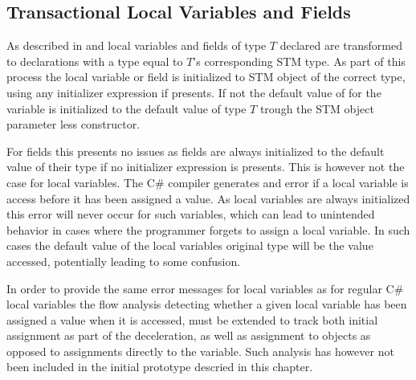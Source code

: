 \subsection{Transactional Local Variables and Fields}
As described in  and  local variables and fields of type $T$ declared  are transformed to declarations with a type equal to $T$'s corresponding \ac{STM} type. As part of this process the local variable or field is initialized to \ac{STM} object of the correct type, using any initializer expression if presents. If not the default value of for the variable is initialized to the default value of type $T$ trough the \ac{STM} object parameter less constructor. 

For fields this presents no issues as fields are always initialized to the default value of their type if no initializer expression is presents\cite[p. 93]{csharp2013specificaiton}. This is however not the case for local variables. The C\# compiler generates and error if a local variable is access before it has been assigned a value\cite[p. 96]{csharp2013specificaiton}. As  local variables are always initialized this error will never occur for such variables, which can lead to unintended behavior in cases where the programmer forgets to assign a  local variable. In such cases the default value of the  local variables original type will be the value accessed, potentially leading to some confusion.

In order to provide the same error messages for  local variables as for regular C\# local variables the flow analysis detecting whether a given local variable has been assigned a value when it is accessed, must be extended to track both initial assignment as part of the deceleration, as well as assignment to  objects  as opposed to assignments directly to the variable. Such analysis has however not been included in the initial prototype descried in this chapter.

